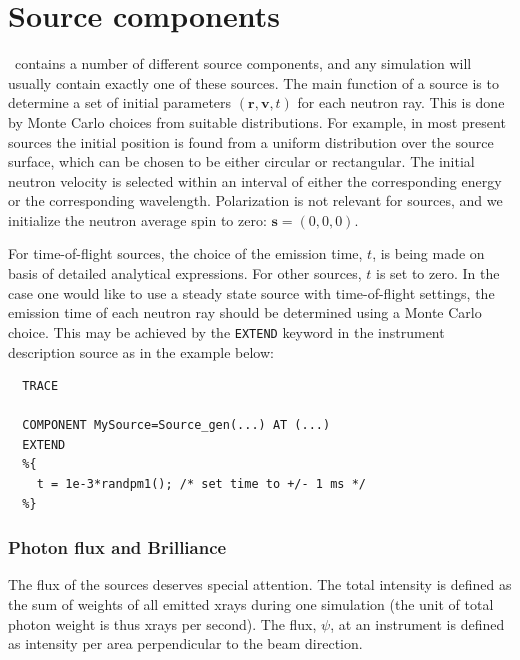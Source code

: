 
\chapter{Source components}
\label{c:source}

\MCX\ contains a number of different source components,
and any simulation will usually contain exactly one of these sources.
The main function of a source is to determine a set of initial
parameters $(\mathbf{r}, \mathbf{v}, t)$
for each neutron ray. This is done by Monte Carlo choices from
suitable distributions. For example, in most present sources
the initial position is
found from a uniform distribution over the source surface,
which can be chosen to be either circular or rectangular.
The initial neutron velocity is selected within an interval
of either the corresponding energy or the corresponding wavelength.
Polarization is not relevant for sources,
and we initialize the neutron average spin to zero: $\mathbf{s}=(0,0,0)$.

For time-of-flight sources, the choice of the emission time, $t$,
is being made on basis of detailed analytical expressions.
For other sources, $t$ is set to zero.
In the case one would like to use a steady state source
with time-of-flight settings,
the emission time of each neutron ray should be determined using
a Monte Carlo choice. This may be achieved by
the \verb+EXTEND+ keyword in the instrument description source
as in the example below:

\begin{verbatim}
  TRACE

  COMPONENT MySource=Source_gen(...) AT (...)
  EXTEND
  %{
    t = 1e-3*randpm1(); /* set time to +/- 1 ms */
  %}
\end{verbatim}

\subsection{Photon flux and Brilliance}
\label{s:xray-flux}
The flux of the sources deserves special attention. The total
intensity is defined as the sum of weights of all emitted xrays
during one simulation
(the unit of total photon weight is thus xrays per second).
The flux, $\psi$, at an instrument is defined as intensity per area perpendicular
to the beam direction.

